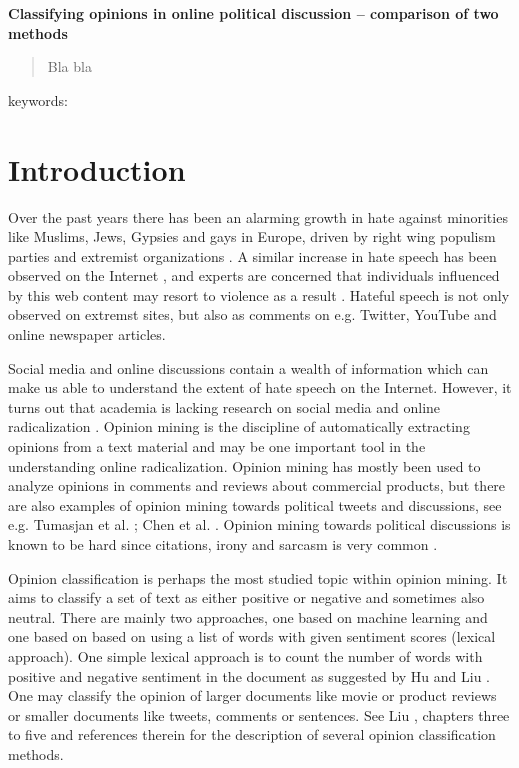 \documentclass[11pt]{article}
\begin{document}
\begin{center}
  \textbf{\Large{Classifying opinions in online political discussion -- comparison of two methods}}

\vspace{5mm}

\end{center}

\begin{abstract}
Bla bla
\end{abstract}

keywords: \textit{}

\section{Introduction}
\label{sec:introduction}

Over the past years there has been an alarming growth in hate against minorities like Muslims, Jews, Gypsies and gays in Europe, driven by right wing populism parties and extremist organizations \cite{r4,r11}. A similar increase in hate speech has been observed on the Internet \cite{r6,s2}, and experts are concerned that individuals influenced by this web content may resort to violence as a result \cite{Strommen12,Sunde13}. Hateful speech is not only observed on extremst sites, but also as comments on e.g. Twitter, YouTube and online newspaper articles.  

Social media and online discussions contain a wealth of information which can make us able to understand the extent of hate speech on the Internet. However, it turns out that academia is lacking research on social media and online radicalization \cite{s1}. Opinion mining is the discipline of automatically extracting opinions from a text material and may be one important tool in the understanding online radicalization. Opinion mining has mostly been used to analyze opinions in comments and reviews about commercial products, but there are also examples of opinion mining towards political tweets and discussions, see e.g. Tumasjan et al. ; Chen et al. . Opinion mining towards political discussions is known to be hard since citations, irony and sarcasm is very common \cite{Bing12}.

Opinion classification is perhaps the most studied topic within opinion mining. It aims to classify a set of text as either positive or negative and sometimes also neutral. There are mainly two approaches, one based on machine learning and one based on based on using a list of words with given sentiment scores (lexical approach). One simple lexical approach is to count the number of words with positive and negative sentiment in the document as suggested by Hu and Liu . One may classify the opinion of larger documents like movie or product reviews or smaller documents like tweets, comments or sentences. See Liu , chapters three to five and references therein for the description of several opinion classification methods. 
\end{document}
